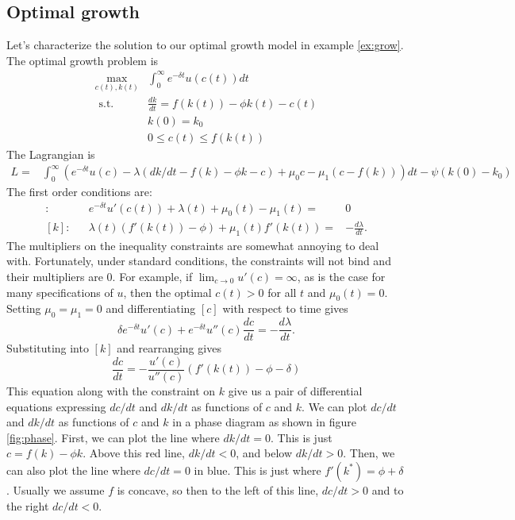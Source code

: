 \subsection{Optimal growth}
Let's characterize the solution to our optimal growth model in example
\ref{ex:grow}. The optimal growth problem is
\begin{align*}
  \max_{c(t),k(t)} & \int_0^\infty e^{-\delta t} u(c(t)) dt \\
  \text{ s.t. } & \frac{dk}{dt} = f(k(t)) - \phi k(t) - c(t) \\
  & k(0) = k_0 \\
  & 0 \leq c(t) \leq f(k(t))
\end{align*}
The Lagrangian is
\begin{align*}
  L = & \int_0^\infty \left(e^{-\delta t} u(c) - \lambda(dk/dt - f(k) -
  \phi k - c ) + \mu_0 c - \mu_1 (c - f(k)) \right)dt - \psi(k(0) -
  k_0)
\end{align*}
The first order conditions are:
\begin{align*}
  [c]: && e^{-\delta t} u'(c(t)) + \lambda(t) + \mu_0(t) - \mu_1(t) = & 0
  \\
  [k]: && \lambda (t) \left( f'(k(t))  - \phi \right) + \mu_1(t)
  f'(k(t)) = & -\frac{d\lambda}{dt}. 
\end{align*}
The multipliers on the inequality constraints are somewhat annoying to
deal with. Fortunately, under standard conditions, the constraints
will not bind and their multipliers are $0$. For example, if $\lim_{c
  \to 0} u'(c) = \infty$, as is the case for many specifications of
$u$, then the optimal $c(t) > 0$ for all $t$ and $\mu_0(t) =
0$. Setting $\mu_0=\mu_1=0$ and differentiating $[c]$ with respect to time
gives
\[ \delta e^{-\delta t} u'(c) + e^{-\delta t} u''(c) \frac{dc}{dt}  = - \frac{d\lambda}{dt}. \]
Substituting into $[k]$ and rearranging gives
\[ \frac{dc}{dt} = -\frac{u'(c)}{u''(c)} \left(f'(k(t)) - \phi -
  \delta \right) \]
This equation along with the constraint on $k$ give us a pair of
differential equations expressing $dc/dt$ and $dk/dt$ as functions of
$c$ and $k$. We can plot $dc/dt$ and $dk/dt$ as functions of $c$ and
$k$ in a phase diagram as shown in figure \ref{fig:phase}. First, we
can plot the line where $dk/dt = 0$. This is just $c = f(k) - \phi
k$.
Above this red line, $dk/dt< 0$, and below $dk/dt>0$.  Then, we can
also plot the line where $dc/dt = 0$ in blue. This is just where
$f'(k^*) = \phi + \delta$. Usually we assume $f$ is concave, so then
to the left of this line, $dc/dt>0$ and to the right $dc/dt<0$.

